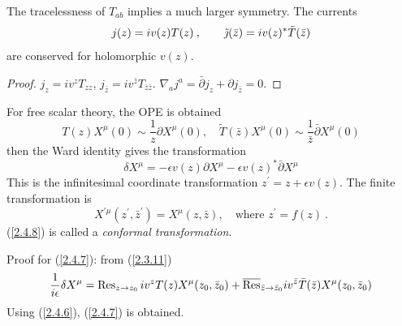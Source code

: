 The tracelessness of $T_{ab}$ implies a much larger symmetry.    
The currents    
\begin{equation}
	j(z)=i v(z) T(z) \:, \qquad \tilde{\jmath}(\bar{z})=i v(z)^{*} \tilde{T}(\bar{z}) \label{2.4.5}
\end{equation}
are conserved for holomorphic $v(z)$.    
\begin{tcolorbox}[breakable]
	\begin{proof}
		 $j_{z}=i v^{z} T_{z z}$, $j_{\bar{z}}=i v^{\bar{z}} T_{\bar{z} \bar{z}}$.    
		 $
		\nabla_{a} j^{a}= \bar{\partial} j_{z}+\partial j_{\bar{z}}=0$.    
	\end{proof}    
\end{tcolorbox}
For free scalar theory, the OPE is obtained    
\begin{equation} \label{2.4.6}
	T(z) X^{\mu}(0) \sim \frac{1}{z} \partial X^{\mu}(0), \quad \tilde{T}(\bar{z}) X^{\mu}(0) \sim \frac{1}{\bar{z}} \bar{\partial} X^{\mu}(0)
\end{equation}
then the Ward identity gives the transformation    
\begin{equation}\label{2.4.7}
	\delta X^{\mu}=-\epsilon v(z) \partial X^{\mu}-\epsilon v(z)^{*} \bar{\partial} X^{\mu}
\end{equation}
This is the infinitesimal coordinate transformation $z^{\prime}=z+\epsilon v(z)$.    
The finite transformation is    
\begin{equation} \label{2.4.8}
	X^{\prime \mu}\left(z^{\prime}, \bar{z}^{\prime}\right)=X^{\mu}(z, \bar{z}), \quad \text{where }z^{\prime}=f(z) \:.
\end{equation}
(\ref{2.4.8}) is called a \emph{conformal transformation}.    
\begin{tcolorbox}[breakable]
	Proof for (\ref{2.4.7}): from (\ref{2.3.11})    
	$$
	\frac{1}{i \epsilon} \delta X^{\mu}=\operatorname{Res}_{z \rightarrow z_{0}} i v^{z} T(z) X^{\mu}(z_{0},\bar{z}_{0})+
	\overline{\operatorname{Res}}_{\bar{z} \rightarrow \bar{z}_{0}} i v^{\bar{z}} \bar{T}(\bar{z}) X^{\mu}(z_{0},\bar{z}_{0})
	$$
	Using (\ref{2.4.6}), (\ref{2.4.7}) is obtained.    
\end{tcolorbox}


